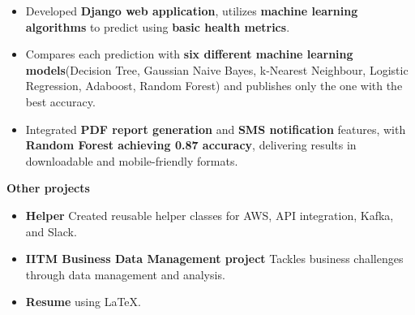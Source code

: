 \documentclass[a4paper,10pt]{article}
\begin{document}
\begin{itemize}
    \item Developed \textbf{Django web application}, utilizes \textbf{machine learning algorithms} to predict using \textbf{basic health metrics}.
    \vspace{-2mm}
    \item Compares each prediction with \textbf{six different machine learning models}(Decision Tree, Gaussian Naive Bayes, k-Nearest Neighbour, Logistic Regression, Adaboost, Random Forest) and publishes only the one with the best accuracy.
    \vspace{-2mm}
    \item Integrated \textbf{PDF report generation} and \textbf{SMS notification} features, with \textbf{Random Forest achieving 0.87 accuracy}, delivering results in downloadable and mobile-friendly formats.
\end{itemize}
\textbf{Other projects}
\vspace{-2mm}
\begin{itemize}
    \item \textbf{Helper} \href{https://github.com/ShreehariA/helpers}{} Created reusable helper classes for AWS, API integration, Kafka, and Slack.
    \vspace{-2mm}
    \item \textbf{IITM Business Data Management project} \href{https://github.com/ShreehariA/IITM_BDM_Project}{} Tackles business challenges through data management and analysis.
    \vspace{-2mm}
    \item \textbf{Resume} \href{https://github.com/ShreehariA/Resume}{} using LaTeX.
\end{itemize}

\end{document}

